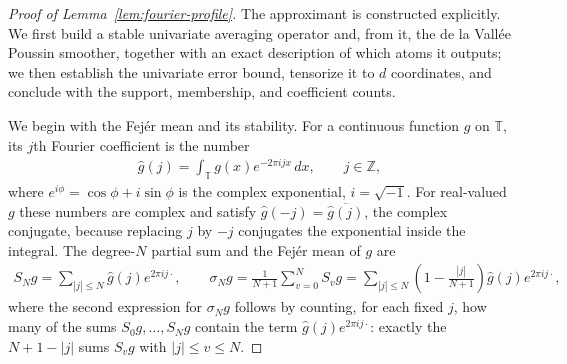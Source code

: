 \begin{proof}[Proof of Lemma~\ref{lem:fourier-profile}]
The approximant is constructed explicitly. We first build a stable univariate averaging operator and, from it, the de la Vall\'ee Poussin smoother, together with an exact description of which atoms it outputs; we then establish the univariate error bound, tensorize it to $d$ coordinates, and conclude with the support, membership, and coefficient counts.

We begin with the Fej\'er mean and its stability. For a continuous function $g$ on $\mathbb T$, its $j$th Fourier coefficient is the number
\begin{align*}
\hat g(j)=\int_{\mathbb T}g(x)e^{-2\pi ijx}\,dx,
\qquad j\in\mathbb Z,
\end{align*}
where $e^{i\phi}=\cos\phi+i\sin\phi$ is the complex exponential, $i=\sqrt{-1}$. For real-valued $g$ these numbers are complex and satisfy $\hat g(-j)=\overline{\hat g(j)}$, the complex conjugate, because replacing $j$ by $-j$ conjugates the exponential inside the integral. The degree-$N$ partial sum and the Fej\'er mean of $g$ are
\begin{align*}
S_Ng=\sum_{|j|\leq N}\hat g(j)e^{2\pi ij\cdot},
\qquad
\sigma_Ng=\frac1{N+1}\sum_{v=0}^NS_vg
=\sum_{|j|\leq N}\left(1-\frac{|j|}{N+1}\right)\hat g(j)e^{2\pi ij\cdot},
\end{align*}
where the second expression for $\sigma_Ng$ follows by counting, for each fixed $j$, how many of the sums $S_0g,\ldots,S_Ng$ contain the term $\hat g(j)e^{2\pi ij\cdot}$: exactly the $N+1-|j|$ sums $S_vg$ with $|j|\leq v\leq N$.


\end{proof}
